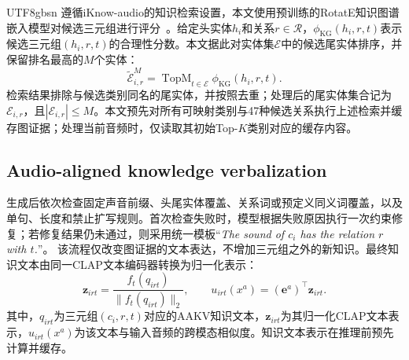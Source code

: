 \begin{CJK*}{UTF8}{gbsn}
遵循iKnow-audio的知识检索设置，本文使用预训练的RotatE知识图谱嵌入模型对候选三元组进行评分~\cite{olvera-etal-2025-iknow,sun2019rotate}。给定头实体$h_i$和关系$r\in\mathcal R$，$\phi_{\mathrm{KG}}(h_i,r,t)$表示候选三元组$(h_i,r,t)$的合理性分数。本文据此对实体集$\mathcal E$中的候选尾实体排序，并保留排名最高的$M$个实体：
\begin{equation}
\widetilde{\mathcal E}_{i,r}^{M}=\operatorname{TopM}_{t\in\mathcal E}\phi_{\mathrm{KG}}(h_i,r,t).
\label{eq:tail-retrieval}
\end{equation}
检索结果排除与候选类别同名的尾实体，并按照去重；处理后的尾实体集合记为$\mathcal E_{i,r}$，且$|\mathcal E_{i,r}|\leq M$。本文预先对所有可映射类别与47种候选关系执行上述检索并缓存图证据；处理当前音频时，仅读取其初始Top-$K$类别对应的缓存内容。

\subsection{Audio-aligned knowledge verbalization}\label{sec:aakv-method}


生成后依次检查固定声音前缀、头尾实体覆盖、关系词或预定义同义词覆盖，以及单句、长度和禁止扩写规则。首次检查失败时，模型根据失败原因执行一次约束修复；若修复结果仍未通过，则采用统一模板“\textit{The sound of $c_i$ has the relation $r$ with $t$.}”。
该流程仅改变图证据的文本表达，不增加三元组之外的新知识。最终知识文本由同一CLAP文本编码器转换为归一化表示：
\begin{equation}
\mathbf z_{irt}=\frac{f_t(q_{irt})}{\|f_t(q_{irt})\|_2},\qquad u_{irt}(x^a)=(\mathbf e^a)^\top\mathbf z_{irt}.
\label{eq:evidence-score}
\end{equation}
其中，$q_{irt}$为三元组$(c_i,r,t)$对应的AAKV知识文本，$\mathbf z_{irt}$为其归一化CLAP文本表示，$u_{irt}(x^a)$为该文本与输入音频的跨模态相似度。知识文本表示在推理前预先计算并缓存。


\end{CJK*}
